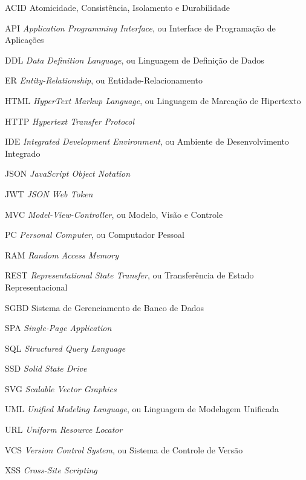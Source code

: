 \documentclass[
	12pt,			%
	openany,		%
	oneside,		%
	a4paper,		%
	english,		%
	brazil			%
	]{abntex2}
\begin{document}
\begin{siglas}

    \item[ACID] Atomicidade, Consistência, Isolamento e Durabilidade
    \item[API] \textit{Application Programming Interface}, ou Interface de Programação de Aplicações
    \item[DDL] \textit{Data Definition Language}, ou Linguagem de Definição de Dados
    \item[ER] \textit{Entity-Relationship}, ou Entidade-Relacionamento
    \item[HTML] \textit{HyperText Markup Language}, ou Linguagem de Marcação de Hipertexto
    \item[HTTP] \textit{Hypertext Transfer Protocol}
    \item[IDE] \textit{Integrated Development Environment}, ou Ambiente de Desenvolvimento Integrado
    \item[JSON] \textit{JavaScript Object Notation}
    \item[JWT] \textit{JSON Web Token}
    \item[MVC] \textit{Model-View-Controller}, ou Modelo, Visão e Controle
    \item[PC] \textit{Personal Computer}, ou Computador Pessoal
    \item[RAM] \textit{Random Access Memory}
    \item[REST] \textit{Representational State Transfer}, ou Transferência de Estado Representacional
    \item[SGBD] Sistema de Gerenciamento de Banco de Dados
    \item[SPA] \textit{Single-Page Application}
    \item[SQL] \textit{Structured Query Language}
    \item[SSD] \textit{Solid State Drive}
    \item[SVG] \textit{Scalable Vector Graphics}
    \item[UML] \textit{Unified Modeling Language}, ou Linguagem de Modelagem Unificada
    \item[URL] \textit{Uniform Resource Locator}
    \item[VCS] \textit{Version Control System}, ou Sistema de Controle de Versão
    \item[XSS] \textit{Cross-Site Scripting}

\end{siglas}
\end{document}
